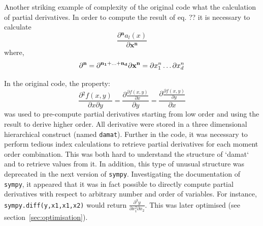 \documentclass[11pt,a4paper]{article}
\newcommand{\sympy}{\texttt{sympy}}
\begin{document}
Another striking example of complexity of the original code what the calculation of partial derivatives.
In order to compute the result of eq. ??\cite{ale_general_2013} it is necessary to calculate\\
\[\frac{\partial{}^\mathbf{n} a_l(x)}{\partial{}\mathbf{x^n}}\]
where,\\
\[\partial{}^\mathbf{n} = \partial{}^\mathbf{n_1+\dots{}+n_d} \\
\partial{} \mathbf{x^n} = \partial{} x^n_1 \dots{} \partial x^n_d\]

In the original code, the property:
\begin{equation}
\label{eq:partial}
\frac{\partial{} ^ 2 f(x,y)}{\partial x \partial y} =
\frac{\partial{} \frac{\partial{} f(x,y)}{\partial x}}{\partial y} =
\frac{\partial{} \frac{\partial{} f(x,y)}{\partial{} y}}{\partial{} x}
\end{equation}
was used to pre-compute partial derivatives starting from low order and using the result to derive higher order.
All derivative were stored in a three dimensional hierarchical construct (named \texttt{damat}).
Further in the code, it was necessary to perform  tedious index calculations to
retrieve partial derivatives for each moment order combination.
This was both hard to understand the structure of `damat` and to retrieve values from it.
In addition, this type of unusual structure was deprecated in the next version of \sympy{}.
Investigating the documentation of \sympy, it appeared that it was in fact possible to directly compute partial derivatives
with respect to arbitrary number and order of variables.
For instance, \texttt{sympy.diff(y,x1,x1,x2)} would return $\frac{\partial^3 y}{\partial x_1^2 \partial x_2}$.
This was later optimised (see section~\ref{sec:optimisation}).
\end{document}
